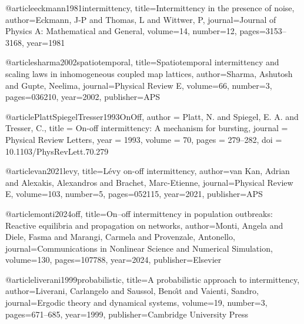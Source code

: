  @article{eckmann1981intermittency,
  title={Intermittency in the presence of noise},
  author={Eckmann, J-P and Thomas, L and Wittwer, P},
  journal={Journal of Physics A: Mathematical and General},
  volume={14},
  number={12},
  pages={3153--3168},
  year={1981}
}


@article{sharma2002spatiotemporal,
  title={Spatiotemporal intermittency and scaling laws in inhomogeneous coupled map lattices},
  author={Sharma, Ashutosh and Gupte, Neelima},
  journal={Physical Review E},
  volume={66},
  number={3},
  pages={036210},
  year={2002},
  publisher={APS}
}



@article{PlattSpiegelTresser1993OnOff,
  author  = {Platt, N. and Spiegel, E. A. and Tresser, C.},
  title   = {On-off intermittency: A mechanism for bursting},
  journal = {Physical Review Letters},
  year    = {1993},
  volume  = {70},
  pages   = {279--282},
  doi     = {10.1103/PhysRevLett.70.279}
}


@article{van2021levy,
  title={L{\'e}vy on-off intermittency},
  author={van Kan, Adrian and Alexakis, Alexandros and Brachet, Marc-Etienne},
  journal={Physical Review E},
  volume={103},
  number={5},
  pages={052115},
  year={2021},
  publisher={APS}
}

@article{monti2024off,
  title={On--off intermittency in population outbreaks: Reactive equilibria and propagation on networks},
  author={Monti, Angela and Diele, Fasma and Marangi, Carmela and Provenzale, Antonello},
  journal={Communications in Nonlinear Science and Numerical Simulation},
  volume={130},
  pages={107788},
  year={2024},
  publisher={Elsevier}
}




@article{liverani1999probabilistic,
  title={A probabilistic approach to intermittency},
  author={Liverani, Carlangelo and Saussol, Beno{\^\i}t and Vaienti, Sandro},
  journal={Ergodic theory and dynamical systems},
  volume={19},
  number={3},
  pages={671--685},
  year={1999},
  publisher={Cambridge University Press}
}



